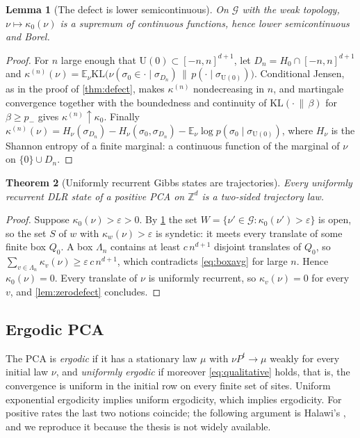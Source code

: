 \documentclass[11pt]{article}
\theoremstyle{plain}
\newtheorem{theorem}{Theorem}[section]
\newtheorem{lemma}[theorem]{Lemma}
\theoremstyle{definition}
\theoremstyle{remark}
\newcommand{\Z}{\mathbb{Z}}
\newcommand{\E}{\mathbb{E}}
\newcommand{\Lam}{\Lambda}
\newcommand{\eps}{\varepsilon}
\newcommand{\Ue}{\mathrm{U}}
\begin{document}
\begin{lemma}[The defect is lower semicontinuous]
\label{lem:lsc}
On $\mathcal G$ with the weak topology, $\nu\mapsto\kappa_0(\nu)$ is a supremum of continuous functions, hence lower semicontinuous and Borel.
\end{lemma}

\begin{proof}
For $n$ large enough that $\Ue(0)\subset[-n,n]^{d+1}$, let $D_n=H_0\cap[-n,n]^{d+1}$ and $\kappa^{(n)}(\nu)=\E_\nu\mathrm{KL}\bigl(\nu(\sigma_0\in\cdot\mid\sigma_{D_n})\,\|\,p(\cdot\mid\sigma_{\Ue(0)})\bigr)$. Conditional Jensen, as in the proof of \cref{thm:defect}, makes $\kappa^{(n)}$ nondecreasing in $n$, and martingale convergence together with the boundedness and continuity of $\mathrm{KL}(\cdot\,\|\,\beta)$ for $\beta\ge p_-$ gives $\kappa^{(n)}\uparrow\kappa_0$. Finally $\kappa^{(n)}(\nu)=H_\nu(\sigma_{D_n})-H_\nu(\sigma_0,\sigma_{D_n})-\E_\nu\log p(\sigma_0\mid\sigma_{\Ue(0)})$, where $H_\nu$ is the Shannon entropy of a finite marginal: a continuous function of the marginal of $\nu$ on $\{0\}\cup D_n$.
\end{proof}

\begin{theorem}[Uniformly recurrent Gibbs states are trajectories]
\label{thm:recurrent}
Every uniformly recurrent DLR state of a positive PCA on $\Z^d$ is a two-sided trajectory law.
\end{theorem}

\begin{proof}
Suppose $\kappa_0(\nu)>\eps>0$. By \cref{lem:lsc} the set $W=\{\nu'\in\mathcal G:\kappa_0(\nu')>\eps\}$ is open, so the set $S$ of $w$ with $\kappa_w(\nu)>\eps$ is syndetic: it meets every translate of some finite box $Q_0$. A box $\Lam_n$ contains at least $c\,n^{d+1}$ disjoint translates of $Q_0$, so $\sum_{v\in\Lam_n}\kappa_v(\nu)\ge\eps\,c\,n^{d+1}$, which contradicts \eqref{eq:boxavg} for large $n$. Hence $\kappa_0(\nu)=0$. Every translate of $\nu$ is uniformly recurrent, so $\kappa_v(\nu)=0$ for every $v$, and \cref{lem:zerodefect} concludes.
\end{proof}

\subsection{Ergodic PCA}

The PCA is \emph{ergodic} if it has a stationary law $\mu$ with $\nu P^t\to\mu$ weakly for every initial law $\nu$, and \emph{uniformly ergodic} if moreover \eqref{eq:qualitative} holds, that is, the convergence is uniform in the initial row on every finite set of sites. Uniform exponential ergodicity implies uniform ergodicity, which implies ergodicity. For positive rates the last two notions coincide; the following argument is Halawi's \cite[Theorem~4.2.3 and Proposition~4.2.4]{Halawi22}, and we reproduce it because the thesis is not widely available.
\end{document}
